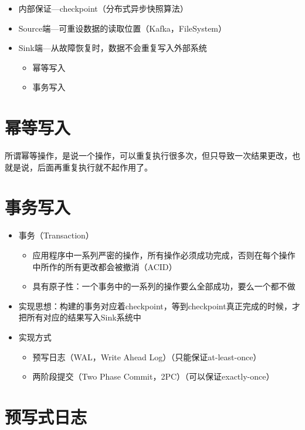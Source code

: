 \documentclass[cn,11pt,chinese]{elegantbook}
\begin{document}
\begin{itemize}
  \item 内部保证—checkpoint（分布式异步快照算法）
  \item Source端—可重设数据的读取位置（Kafka，FileSystem）
  \item Sink端—从故障恢复时，数据不会重复写入外部系统
  \begin{itemize}
      \item 幂等写入
      \item 事务写入
  \end{itemize}
\end{itemize}

\section{幂等写入}

所谓幂等操作，是说一个操作，可以重复执行很多次，但只导致一次结果更改，也就是说，后面再重复执行就不起作用了。

\section{事务写入}

\begin{itemize}
  \item 事务（Transaction）
  \begin{itemize}
      \item 应用程序中一系列严密的操作，所有操作必须成功完成，否则在每个操作中所作的所有更改都会被撤消（ACID）
      \item 具有原子性：一个事务中的一系列的操作要么全部成功，要么一个都不做
  \end{itemize}
  \item 实现思想：构建的事务对应着checkpoint，等到checkpoint真正完成的时候，才把所有对应的结果写入Sink系统中
  \item 实现方式
  \begin{itemize}
      \item 预写日志（WAL，Write Ahead Log）（只能保证at-least-once）
      \item 两阶段提交（Two Phase Commit，2PC）（可以保证exactly-once）
  \end{itemize}
\end{itemize}

\section{预写式日志}
\end{document}
